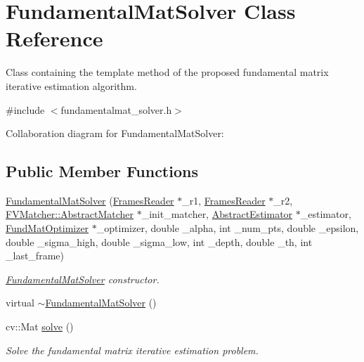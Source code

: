 \hypertarget{classFundamentalMatSolver}{}\section{Fundamental\+Mat\+Solver Class Reference}
\label{classFundamentalMatSolver}


Class containing the template method of the proposed fundamental matrix iterative estimation algorithm.  




{\ttfamily \#include $<$fundamentalmat\+\_\+solver.\+h$>$}



Collaboration diagram for Fundamental\+Mat\+Solver\+:
\subsection*{Public Member Functions}
\begin{DoxyCompactItemize}
\item 
\hyperlink{classFundamentalMatSolver_a499f89d03b8a4c64737da228fcee4793}{Fundamental\+Mat\+Solver} (\hyperlink{classFramesReader}{Frames\+Reader} $\ast$\+\_\+r1, \hyperlink{classFramesReader}{Frames\+Reader} $\ast$\+\_\+r2, \hyperlink{classFVMatcher_1_1AbstractMatcher}{F\+V\+Matcher\+::\+Abstract\+Matcher} $\ast$\+\_\+init\+\_\+matcher, \hyperlink{classAbstractEstimator}{Abstract\+Estimator} $\ast$\+\_\+estimator, \hyperlink{classFundMatOptimizer}{Fund\+Mat\+Optimizer} $\ast$\+\_\+optimizer, double \+\_\+alpha, int \+\_\+num\+\_\+pts, double \+\_\+epsilon, double \+\_\+sigma\+\_\+high, double \+\_\+sigma\+\_\+low, int \+\_\+depth, double \+\_\+th, int \+\_\+last\+\_\+frame)
\begin{DoxyCompactList}\small\item\em \hyperlink{classFundamentalMatSolver}{Fundamental\+Mat\+Solver} constructor. \end{DoxyCompactList}\item 
virtual \hyperlink{classFundamentalMatSolver_a15aff405ed4f1670053c83bfca672149}{$\sim$\+Fundamental\+Mat\+Solver} ()
\item 
cv\+::\+Mat \hyperlink{classFundamentalMatSolver_aaa14f6188fecb5c16a7df7009503d72d}{solve} ()
\begin{DoxyCompactList}\small\item\em Solve the fundamental matrix iterative estimation problem. \end{DoxyCompactList}\end{DoxyCompactItemize}


